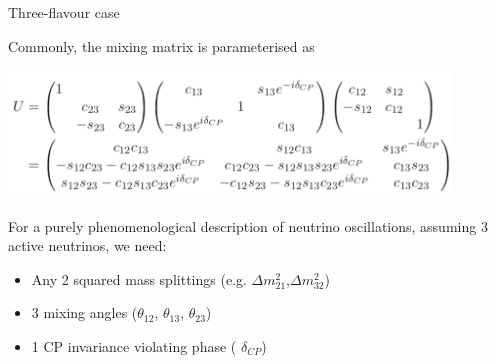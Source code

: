 \begin{frame}{Three-flavour case}

Commonly, the mixing matrix is parameterised as

  \begin{center}
    \includegraphics[width=0.88\textwidth]{./images/osc101/pmns_parameterization}\\
  \end{center}

\vspace{0.4cm}
For a purely phenomenological description of neutrino oscillations,
assuming 3 active neutrinos, we need:
\begin{itemize}
\item Any 2 squared mass splittings (e.g. {\color{green}${\Delta}m^{2}_{21}$},{\color{green}${\Delta}m^{2}_{32}$})
\item 3 mixing angles ({\color{red}$\theta_{12}$}, {\color{red}$\theta_{13}$}, {\color{red}$\theta_{23}$})
\item 1 CP invariance violating phase ({\color{red} $\delta_{CP}$})
\end{itemize}

\end{frame}

%
%
%

